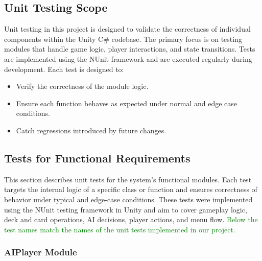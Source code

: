 \documentclass[12pt]{article}
\newcommand{\added}[1]{\textcolor{green}{#1}}
\begin{document}
\subsection{Unit Testing Scope}

Unit testing in this project is designed to validate the correctness of individual components within the Unity C\# codebase. The primary focus is on testing modules that handle game logic, player interactions, and state transitions. Tests are implemented using the NUnit framework and are executed regularly during development. Each test is designed to:

\begin{itemize}
    \item Verify the correctness of the module logic.
    \item Ensure each function behaves as expected under normal and edge case conditions.
    \item Catch regressions introduced by future changes.
\end{itemize}

\subsection{Tests for Functional Requirements}

This section describes unit tests for the system's functional modules. Each test targets the internal logic of a specific class or function and ensures correctness of behavior under typical and edge-case conditions. These tests were implemented using the NUnit testing framework in Unity and aim to cover gameplay logic, deck and card operations, AI decisions, player actions, and menu flow. \added{Below the test names match the names of the unit tests implemented in our project.}

\subsubsection{AIPlayer Module}
\end{document}
